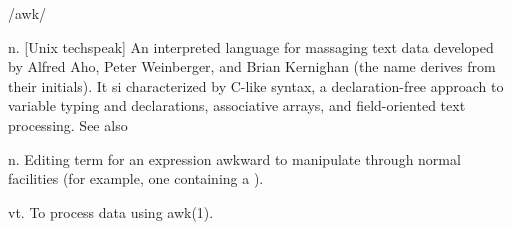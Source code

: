  /awk/

\begin{inparaenum}
	\item n. [Unix techspeak] An interpreted language for massaging text data developed by Alfred Aho, Peter Weinberger, and Brian Kernighan
		(the name derives from their initials). It si characterized by C-like syntax, a declaration-free approach to variable typing and
		declarations, associative arrays, and field-oriented text processing. See also 
	\item n. Editing term for an expression awkward to manipulate through normal  facilities (for example, one containing
		a ).
	\item vt. To process data using awk(1).
\end{inparaenum}

